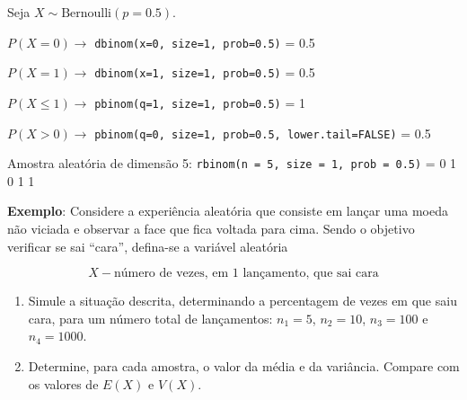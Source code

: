\documentclass[
]{book}
\begin{document}
Seja \(X \sim \text{Bernoulli}(p=0.5)\).

\(P(X=0) \to\) \texttt{dbinom(x=0,\ size=1,\ prob=0.5)} = 0.5

\(P(X=1) \to\) \texttt{dbinom(x=1,\ size=1,\ prob=0.5)} = 0.5

\(P(X \leq 1) \to\) \texttt{pbinom(q=1,\ size=1,\ prob=0.5)} = 1

\(P(X>0) \to\) \texttt{pbinom(q=0,\ size=1,\ prob=0.5,\ lower.tail=FALSE)} = 0.5

Amostra aleatória de dimensão 5: \texttt{rbinom(n\ =\ 5,\ size\ =\ 1,\ prob\ =\ 0.5)} = 0 1 0 1 1

\textbf{Exemplo}: Considere a experiência aleatória que consiste em lançar
uma moeda não viciada e observar a face que fica voltada para cima.
Sendo o objetivo verificar se sai ``cara'', defina-se a variável aleatória

\[X - \text{número de vezes, em 1 lançamento, que sai cara}\]

\begin{enumerate}
\def\labelenumi{(\alph{enumi})}
\item
  Simule a situação descrita, determinando a percentagem de vezes em que saiu cara, para um número total de lançamentos: \(n_1 = 5\), \(n_2=10\), \(n_3=100\) e \(n_4=1000\).
\item
  Determine, para cada amostra, o valor da média e da variância. Compare com os valores de \(E(X)\) e \(V(X)\).
\end{enumerate}
\end{document}

